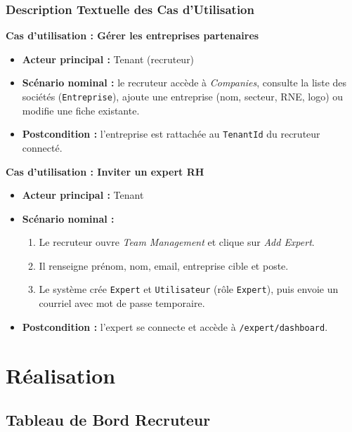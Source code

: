 \subsubsection{Description Textuelle des Cas d'Utilisation}

\textbf{Cas d'utilisation : Gérer les entreprises partenaires}

\begin{itemize}
    \item \textbf{Acteur principal :} Tenant (recruteur)
    \item \textbf{Scénario nominal :} le recruteur accède à \textit{Companies}, consulte
    la liste des sociétés (\texttt{Entreprise}), ajoute une entreprise (nom, secteur, RNE,
    logo) ou modifie une fiche existante.
    \item \textbf{Postcondition :} l'entreprise est rattachée au \texttt{TenantId} du
    recruteur connecté.
\end{itemize}

\textbf{Cas d'utilisation : Inviter un expert RH}

\begin{itemize}
    \item \textbf{Acteur principal :} Tenant
    \item \textbf{Scénario nominal :}
    \begin{enumerate}
        \item Le recruteur ouvre \textit{Team Management} et clique sur \textit{Add Expert}.
        \item Il renseigne prénom, nom, email, entreprise cible et poste.
        \item Le système crée \texttt{Expert} et \texttt{Utilisateur} (rôle \texttt{Expert}),
        puis envoie un courriel avec mot de passe temporaire.
    \end{enumerate}
    \item \textbf{Postcondition :} l'expert se connecte et accède à \texttt{/expert/dashboard}.
\end{itemize}

\section{Réalisation}

\subsection{Tableau de Bord Recruteur}


